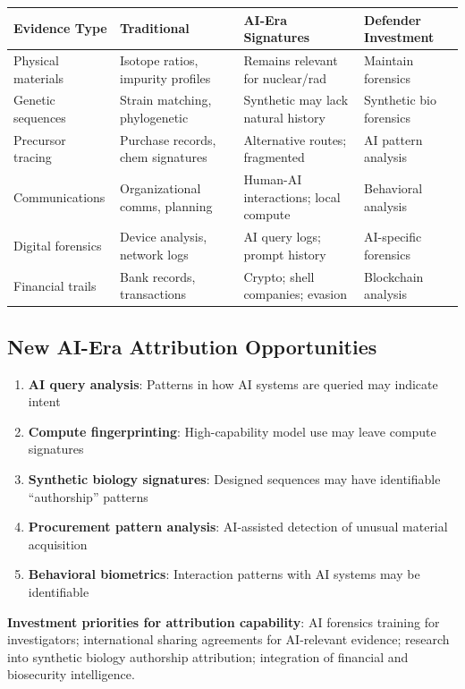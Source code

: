 \documentclass[11pt,letterpaper]{article}
\begin{document}
\begin{center}
\small
\begin{tabular}{L{2.5cm}L{3.5cm}L{3.5cm}L{2.5cm}}
\toprule
\textbf{Evidence Type} & \textbf{Traditional} & \textbf{AI-Era Signatures} & \textbf{Defender Investment} \\
\midrule
Physical materials & Isotope ratios, impurity profiles & Remains relevant for nuclear/rad & Maintain forensics \\
Genetic sequences & Strain matching, phylogenetic & Synthetic may lack natural history & Synthetic bio forensics \\
Precursor tracing & Purchase records, chem signatures & Alternative routes; fragmented & AI pattern analysis \\
Communications & Organizational comms, planning & Human-AI interactions; local compute & Behavioral analysis \\
Digital forensics & Device analysis, network logs & AI query logs; prompt history & AI-specific forensics \\
Financial trails & Bank records, transactions & Crypto; shell companies; evasion & Blockchain analysis \\
\bottomrule
\end{tabular}
\end{center}

\subsection{New AI-Era Attribution Opportunities}

\begin{enumerate}[nosep]
  \item \textbf{AI query analysis}: Patterns in how AI systems are queried may indicate intent
  \item \textbf{Compute fingerprinting}: High-capability model use may leave compute signatures
  \item \textbf{Synthetic biology signatures}: Designed sequences may have identifiable ``authorship'' patterns
  \item \textbf{Procurement pattern analysis}: AI-assisted detection of unusual material acquisition
  \item \textbf{Behavioral biometrics}: Interaction patterns with AI systems may be identifiable
\end{enumerate}

\textbf{Investment priorities for attribution capability}: AI forensics training for investigators; international sharing agreements for AI-relevant evidence; research into synthetic biology authorship attribution; integration of financial and biosecurity intelligence.
\end{document}
